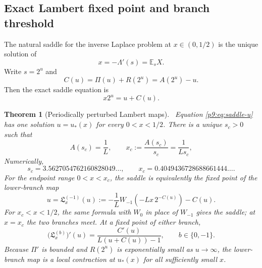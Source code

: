 \documentclass[11pt]{article}
\numberwithin{equation}{section}
\newtheorem{theorem}{Theorem}[section]
\theoremstyle{definition}
\theoremstyle{remark}
\newcommand{\E}{\mathbb E}
\begin{document}
\subsection{Exact Lambert fixed point and branch threshold}
The natural saddle for the inverse Laplace problem at $x\in(0,1/2)$ is the unique solution
of
\begin{equation}
 x=-\Lambda'(s)=\E_sX.                                    \label{p9:eq:saddle-s}
\end{equation}
Write $s=2^u$ and
\begin{equation}
 C(u)=\Pi(u)+R(2^u)=A(2^u)-u.                              \label{p9:eq:C-u}
\end{equation}
Then the exact saddle equation is
\begin{equation}
 x2^u=u+C(u).                                               \label{p9:eq:saddle-u}
\end{equation}

\begin{theorem}[Periodically perturbed Lambert maps]\label{p9:thm:periodic-W}
\statusN\ Equation \eqref{p9:eq:saddle-u} has one solution $u=u_*(x)$ for every
$0<x<1/2$.  There is a unique $s_c>0$ such that
\begin{equation}
 A(s_c)=\frac1L,
 \qquad
 x_c:=\frac{A(s_c)}{s_c}=\frac1{Ls_c},                    \label{p9:eq:xc-def}
\end{equation}
Numerically,
\begin{equation}
 s_c=3.5627054762160828049\ldots,
 \qquad x_c=0.4049436728688661444\ldots.                  \label{p9:eq:xc-num}
\end{equation}
For the endpoint range $0<x<x_c$, the saddle is equivalently the fixed point of the
lower-branch map
\begin{equation}
 \boxed{
 u=\mathfrak L_x^{(-1)}(u):=-\frac1L
 W_{-1}\!\left(-Lx\,2^{-C(u)}\right)-C(u).}                \label{p9:eq:W-map}
\end{equation}
For $x_c<x<1/2$, the same formula with $W_0$ in place of $W_{-1}$ gives the saddle; at
$x=x_c$ the two branches meet.  At a fixed point of either branch,
\begin{equation}
 \boxed{
 \bigl(\mathfrak L_x^{(b)}\bigr)'(u)
 =\frac{C'(u)}{L(u+C(u))-1},\qquad b\in\{0,-1\}.}          \label{p9:eq:W-derivative}
\end{equation}
Because $\Pi'$ is bounded and $R(2^u)$ is exponentially small as $u\to\infty$, the
lower-branch map is a local contraction at $u_*(x)$ for all sufficiently small $x$.
\end{theorem}
\end{document}
